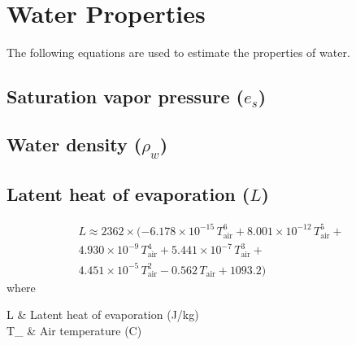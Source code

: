 \newpage
\appendix
\section{Water Properties} \label{water_properties}
The following equations are used to estimate the properties of water.
\subsection{Saturation vapor pressure ($e_s$)}
\subsection{Water density ($\rho_w$)}
\subsection{Latent heat of evaporation ($L$)}
\begin{multline}
\label{eq:latent_heat}
    L \approx 2362\times(-6.178\times10^{-15}\,T_{\text{air}}^6 +
        8.001\times10^{-12}\,T_{\text{air}}^5 + \\
        4.930\times10^{-9}\,T_{\text{air}}^4 +
        5.441\times10^{-7}\,T_{\text{air}}^3 + \\
        4.451\times10^{-5}\,T_{\text{air}}^2 -
        0.562\,T_{\text{air}}+1093.2)
\end{multline}
where
\begin{conditions*}
    L & Latent heat of evaporation (J/kg) \\
    T_{} & Air temperature (\degree C)
\end{conditions*}